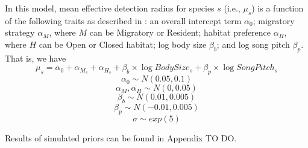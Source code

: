 \documentclass[12pt]{article}
\begin{document}
\par In this model, mean effective detection radius for species $s$ (i.e., $\mu_s$) is a function of the following traits as described in \cite{solymos_phylogeny_2018}: an overall intercept term $\alpha_0$; migratory strategy $\alpha_M$, where $M$ can be Migratory or Resident; habitat preference $\alpha_H$, where $H$ can be Open or Closed habitat; log body size $\beta_b$; and log song pitch $\beta_p$. 
That is, we have
$$ \mu_s = \alpha_0 + \alpha_{M_s} + \alpha_{H_s} + \beta_b \times \log BodySize_s + \beta_p \times \log SongPitch_s$$
$$\alpha_0 \sim N(0.05, 0.1)$$
$$ \alpha_M, \alpha_H \sim N(0, 0.05)$$
$$ \beta_b \sim N(0.01, 0.005)$$
$$ \beta_p \sim N(-0.01, 0.005) $$
$$\sigma \sim exp(5)$$

\par Results of simulated priors can be found in Appendix TO DO.


\end{document}
